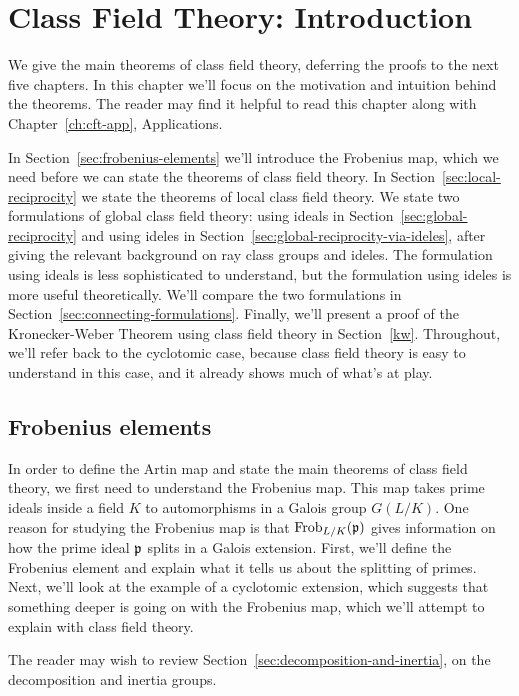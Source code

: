 \chapter{Class Field Theory: Introduction}
We give the main theorems of class field theory, deferring the proofs to the next five chapters. In this chapter we'll focus on the motivation and intuition behind the theorems. The reader may find it helpful to read this chapter along with Chapter~\ref{ch:cft-app}, Applications.

In Section~\ref{sec:frobenius-elements} we'll introduce the Frobenius map, which we need before we can state the theorems of class field theory. In Section~\ref{sec:local-reciprocity} we state the theorems of local class field theory. We state two formulations of global class field theory: using ideals in Section~\ref{sec:global-reciprocity} and using ideles in Section~\ref{sec:global-reciprocity-via-ideles}, after giving the relevant background on ray class groups and ideles. The formulation using ideals is less sophisticated to understand, but the formulation using ideles is more useful theoretically. We'll compare the two formulations in Section~\ref{sec:connecting-formulations}. Finally, we'll present a proof of the Kronecker-Weber Theorem using class field theory in Section~\ref{kw}. Throughout, we'll refer back to the cyclotomic case, because class field theory is easy to understand in this case, and it already shows much of what's at play.
\section{Frobenius elements}
In order to define the Artin map and state the main theorems of class field theory, we first need to understand the Frobenius map. This map takes prime ideals inside a field $K$ to automorphisms in a Galois group $G(L/K)$. One reason for studying the Frobenius map is that $\operatorname{Frob}_{L/K}(\mathfrak{p})$ gives information on how the prime ideal $\mathfrak{p}$ splits in a Galois extension. First, we'll define the Frobenius element and explain what it tells us about the splitting of primes. Next, we'll look at the example of a cyclotomic extension, which suggests that something deeper is going on with the Frobenius map, which we'll attempt to explain with class field theory.

The reader may wish to review Section~\ref{sec:decomposition-and-inertia}, on the decomposition and inertia groups.

